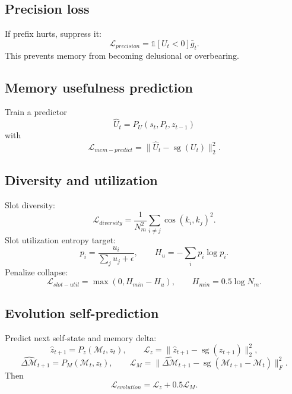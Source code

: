 \documentclass[11pt]{article}
\newcommand{\sg}{\operatorname{sg}}
\newcommand{\cosine}{\operatorname{cos}}
\newcommand{\Mem}{\mathcal{M}}
\begin{document}
\subsection{Precision loss}

If prefix hurts, suppress it:
\begin{equation}
    \mathcal{L}_{precision}=\mathbb{1}[U_t<0]\bar{g}_t.
\end{equation}
This prevents memory from becoming delusional or overbearing.

\subsection{Memory usefulness prediction}

Train a predictor
\begin{equation}
    \hat{U}_t=P_U(s_t,P_t,z_{t-1})
\end{equation}
with
\begin{equation}
    \mathcal{L}_{mem-predict}=\|\hat{U}_t-\sg(U_t)\|_2^2.
\end{equation}

\subsection{Diversity and utilization}

Slot diversity:
\begin{equation}
    \mathcal{L}_{diversity}=\frac{1}{N_m^2}\sum_{i\ne j}\cosine(k_i,k_j)^2.
\end{equation}
Slot utilization entropy target:
\begin{equation}
    p_i=\frac{u_i}{\sum_j u_j+\epsilon},\qquad H_u=-\sum_i p_i\log p_i.
\end{equation}
Penalize collapse:
\begin{equation}
    \mathcal{L}_{slot-util}=\max(0,H_{min}-H_u),\qquad H_{min}=0.5\log N_m.
\end{equation}

\subsection{Evolution self-prediction}

Predict next self-state and memory delta:
\begin{equation}
    \hat{z}_{t+1}=P_z(\Mem_t,z_t),\qquad \mathcal{L}_z=\|\hat{z}_{t+1}-\sg(z_{t+1})\|_2^2,
\end{equation}
\begin{equation}
    \widehat{\Delta\Mem}_{t+1}=P_M(\Mem_t,z_t),\qquad \mathcal{L}_M=\|\widehat{\Delta\Mem}_{t+1}-\sg(\Mem_{t+1}-\Mem_t)\|_F^2.
\end{equation}
Then
\begin{equation}
    \mathcal{L}_{evolution}=\mathcal{L}_z+0.5\mathcal{L}_M.
\end{equation}
\end{document}
